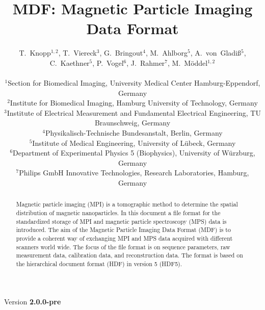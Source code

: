 \documentclass[landscape,a4paper]{article} %
\begin{document}
\title{MDF: Magnetic Particle Imaging Data Format}
\newcommand{\version}{2.0.0-pre}

\author{
T.~Knopp$^{1,2}$, T.~Viereck$^3$, G.~Bringout$^4$, M.~Ahlborg$^5$, A.~von~Gladi\ss$^5$, C.~Kaethner$^5$, P.~Vogel$^6$, J.~Rahmer$^7$, M.~M\"oddel$^{1,2}$ \\ \\
$^1$Section for Biomedical Imaging, University Medical Center Hamburg-Eppendorf, Germany\\
$^2$Institute for Biomedical Imaging, Hamburg University of Technology, Germany\\
$^3$Institute of Electrical Measurement and Fundamental Electrical Engineering, TU Braunschweig, Germany\\
$^4$Physikalisch-Technische Bundesanstalt, Berlin, Germany\\
$^5$Institute of Medical Engineering, University of  Lübeck, Germany\\
$^6$Department of Experimental Physics 5 (Biophysics), University of Würzburg, Germany\\
$^7$Philips GmbH Innovative Technologies, Research Laboratories, Hamburg, Germany
}

\maketitle
\begin{center}
Version \textbf{\version}
\end{center}

\begin{abstract}
Magnetic particle imaging (MPI) is a tomographic method to determine the spatial distribution of magnetic nanoparticles. In this document a file format for the standardized storage of MPI and magnetic particle spectroscopy (MPS) data is introduced. The aim of the Magnetic Particle Imaging Data Format (MDF) is to provide a coherent way of exchanging MPI and MPS data acquired with different scanners world wide. The focus of the file format is on sequence parameters, raw measurement data, calibration data, and reconstruction data. The format is based on the hierarchical document format (HDF) in version 5 (HDF5).
\end{abstract}
\end{document}
